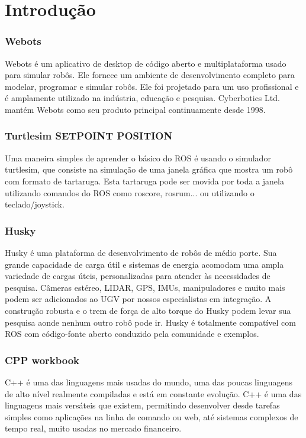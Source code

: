 \chapter{Introdução}
\label{chap:intro}
\subsection{Webots}
Webots é um aplicativo de desktop de código aberto e multiplataforma usado para simular robôs. 
Ele fornece um ambiente de desenvolvimento completo para modelar, programar e simular robôs.
Ele foi projetado para um uso profissional e é amplamente utilizado na indústria, educação e pesquisa.
Cyberbotics Ltd. mantém Webots como seu produto principal continuamente desde 1998.\cite{Cyberbotics}
\subsection{Turtlesim SETPOINT POSITION }
Uma maneira simples de aprender o básico do ROS é usando o simulador turtlesim, que consiste na simulação 
de uma janela gráfica que mostra um robô com formato de tartaruga. Esta tartaruga pode ser movida por 
toda a janela utilizando comandos do ROS como roscore, rosrum... ou utilizando o teclado/joystick.\cite{ROSRoboticsByExample}
\subsection{Husky}
Husky é uma plataforma de desenvolvimento de robôs de médio porte. Sua grande capacidade de carga útil e sistemas de energia acomodam uma ampla variedade de cargas úteis, personalizadas para atender às necessidades de pesquisa. Câmeras estéreo, LIDAR, GPS, IMUs, manipuladores e muito mais podem ser adicionados ao UGV por nossos especialistas em integração. A construção robusta e o trem de força de alto torque do Husky podem levar sua pesquisa aonde nenhum outro robô pode ir. Husky é totalmente compatível com ROS com código-fonte aberto conduzido pela comunidade e exemplos.\cite{Clearpathrobotics}
\subsection{CPP workbook}
C++ é uma das linguagens mais usadas do mundo, uma das poucas linguagens de alto nível realmente compiladas e está em constante evolução.
C++ é uma das linguagens mais versáteis que existem, permitindo desenvolver desde tarefas simples como aplicações na linha de comando ou web, até sistemas complexos de tempo real, muito usadas no mercado financeiro. 

